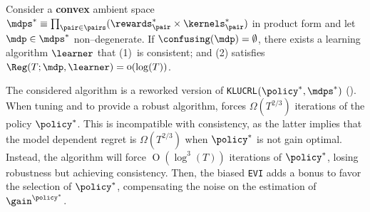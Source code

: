\documentclass[preprint,cleveref,12pt]{colt2025}
\def\product{\prod}
\DeclareMathOperator*{\oh}{\mathrm{o}}
\DeclareMathOperator*{\OH}{\mathrm{O}}
\def\model{\mdp}
\def\models{\mdps}
\newcommand{\strong}[1]{\textbf{#1}}
\begin{document}
    \begin{proposition}
    \label{proposition_confusing_empty_consistent}
        Consider a \strong{convex} ambient space $\models^* \equiv \product_{\pair \in \pairs} (\rewards^*_\pair \times \kernels^*_\pair)$ in product form and let $\model \in \models^*$ non--degenerate.
        If $\confusing(\model) = \emptyset$, there exists a learning algorithm $\learner$ that 
        (1)~is consistent; and
        (2) satisfies $\Reg(T; \model, \learner) = \oh(\log(T))$.
    \end{proposition}

    The considered algorithm is a reworked version of \texttt{KLUCRL}$(\policy^*, \models^*)$ (). 
    When tuning  and  to provide a robust algorithm,  forces $\Omega(T^{2/3})$ iterations of the policy $\policy^*$.
    This is incompatible with consistency, as the latter implies that the model dependent regret is $\Omega(T^{2/3})$ when $\policy^*$ is not gain optimal. 
    Instead, the algorithm will force $\OH(\log^{3}(T))$ iterations of $\policy^*$, losing robustness but achieving consistency. 
    Then, the biased \texttt{EVI} adds a bonus to favor the selection of $\policy^*$, compensating the noise on the estimation of $\gain^{\policy^*}$.
    \vspace{-1em}
\end{document}
